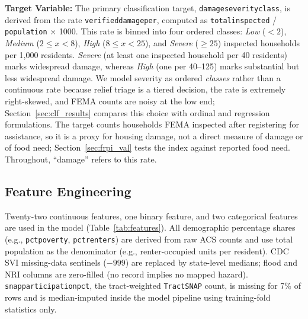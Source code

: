 \documentclass[conference]{IEEEtran}
\renewcommand{\_}{\origunderscore\allowbreak}
\begin{document}
\textbf{Target Variable:}
The primary classification target, \texttt{damage\_severity\_class},
is derived from the rate \texttt{verified\_damage\_per\_1000}, computed
as \texttt{total\_inspected} / \texttt{population} $\times$ 1000. This rate is binned into four
ordered classes: \textit{Low} ($<2$), \textit{Medium}
($2 \leq x < 8$), \textit{High} ($8 \leq x < 25$), and
\textit{Severe} ($\geq 25$) inspected households per 1,000
residents. \textit{Severe} (at least one inspected household per
40 residents) marks widespread damage, whereas \textit{High} (one
per 40--125) marks substantial but less widespread damage. We model severity as ordered \textit{classes} rather
than a continuous rate because relief triage is a tiered
decision, the rate is extremely right-skewed, and FEMA counts
are noisy at the low end; Section~\ref{sec:clf_results} compares
this choice with ordinal and regression formulations. The target
counts households FEMA inspected after registering for assistance,
so it is a proxy for housing damage, not a direct measure of damage
or of food need; Section~\ref{sec:frpi_val} tests the index against
reported food need. Throughout, ``damage'' refers to this rate.

\subsection{Feature Engineering}

Twenty-two continuous features, one binary feature, and two
categorical features are used in the model (Table~\ref{tab:features}).
All demographic percentage shares (e.g., \texttt{pct\_poverty},
\texttt{pct\_renters}) are derived from raw ACS counts and use
total population as the denominator (e.g., renter-occupied units
per resident).
CDC SVI missing-data sentinels ($-999$) are replaced by
state-level medians; flood and NRI columns are zero-filled (no
record implies no mapped hazard). \texttt{snap\_participation\_pct},
the tract-weighted \texttt{TractSNAP} count, is missing for 7\%
of rows and is median-imputed inside the model pipeline using
training-fold statistics only.
\end{document}
